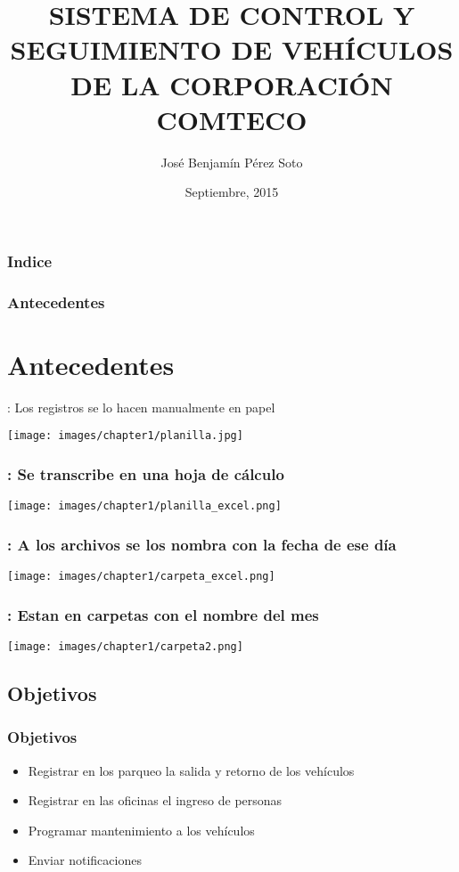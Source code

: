 \documentclass{beamer}
\title{SISTEMA DE CONTROL Y SEGUIMIENTO DE VEH\'ICULOS DE LA CORPORACI\'ON COMTECO}
\author{Jos\'e Benjam\'in P\'erez Soto}
\institute{Universidad Mayor de San Sim\'on \\ Carrera de Licenciatura en Inform\'atica}
\date{Septiembre, 2015}
\begin{document}
\frame{\titlepage}

\begin{frame}
\frametitle{Indice}
\tableofcontents
\end{frame}

\begin{frame}
  \frametitle{Antecedentes}
  \section{Antecedentes}
  : Los registros se lo hacen manualmente en papel
  \begin{center}
    \texttt{[image: images/chapter1/planilla.jpg]}
  \end{center}
\end{frame}

\begin{frame}
  \frametitle{: Se transcribe en una hoja de c\'alculo}
  \begin{center}
    \texttt{[image: images/chapter1/planilla\_excel.png]}
  \end{center}
\end{frame}

\begin{frame}
  \frametitle{: A los archivos se los nombra con la fecha de ese d\'ia}
  \begin{center}
    \texttt{[image: images/chapter1/carpeta\_excel.png]}
  \end{center}
\end{frame}

\begin{frame}
  \frametitle{: Estan en carpetas con el nombre del mes}
  \begin{center}
    \texttt{[image: images/chapter1/carpeta2.png]}
  \end{center}
\end{frame}

\begin{frame}
  \section{Objetivos}
  \frametitle{Objetivos}
  \begin{itemize}
      \item Registrar en los parqueo la salida y retorno de los veh\'iculos
      \item Registrar en las oficinas el ingreso de personas
      \item Programar mantenimiento a los veh\'iculos
      \item Enviar notificaciones
  \end{itemize}
\end{frame}
\end{document}
